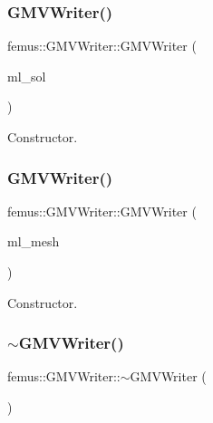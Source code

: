 \subsubsection{\texorpdfstring{G\+M\+V\+Writer()}{GMVWriter()}\hspace{0.1cm}{\footnotesize\ttfamily [1/2]}}
{\footnotesize\ttfamily femus\+::\+G\+M\+V\+Writer\+::\+G\+M\+V\+Writer (\begin{DoxyParamCaption}\item[{\mbox{\hyperlink{classfemus_1_1_multi_level_solution}{Multi\+Level\+Solution}} $\ast$}]{ml\+\_\+sol }\end{DoxyParamCaption})}

Constructor. \mbox{\label{classfemus_1_1_g_m_v_writer_a1e320f0b560efd66b7a4450b7c3f055f}} 
\subsubsection{\texorpdfstring{G\+M\+V\+Writer()}{GMVWriter()}\hspace{0.1cm}{\footnotesize\ttfamily [2/2]}}
{\footnotesize\ttfamily femus\+::\+G\+M\+V\+Writer\+::\+G\+M\+V\+Writer (\begin{DoxyParamCaption}\item[{\mbox{\hyperlink{classfemus_1_1_multi_level_mesh}{Multi\+Level\+Mesh}} $\ast$}]{ml\+\_\+mesh }\end{DoxyParamCaption})}

Constructor. \mbox{\label{classfemus_1_1_g_m_v_writer_afdb81e7c6eb8b793e8615a74a11bb19b}} 
\subsubsection{\texorpdfstring{$\sim$\+G\+M\+V\+Writer()}{~GMVWriter()}}
{\footnotesize\ttfamily femus\+::\+G\+M\+V\+Writer\+::$\sim$\+G\+M\+V\+Writer (\begin{DoxyParamCaption}{ }\end{DoxyParamCaption})\hspace{0.3cm}{\ttfamily [virtual]}}


